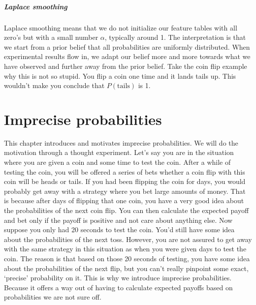 \documentclass{report}
\theoremstyle{definition}
\begin{document}
\paragraph{Laplace smoothing}
Laplace smoothing means that we do not initialize our feature tables with all zero's but with a small number $\alpha$, typically around 1. The interpretation is that we start from a prior belief that all probabilities are uniformly distributed. When experimental results flow in, we adapt our belief more and more towards what we have observed and further away from the prior belief. Take the coin flip example why this is not so stupid. You flip a coin one time and it lands tails up. This wouldn't make you conclude that $P(\text{tails})$ is 1. 






\chapter{Imprecise probabilities}
This chapter introduces and motivates imprecise probabilities. We will do the motivation through a thought experiment. Let's say you are in the situation where you are given a coin and some time to test the coin. After a while of testing the coin, you will be offered a series of bets whether a coin flip with this coin will be heads or tails. If you had been flipping the coin for days, you would probably get away with a strategy where you bet large amounts of money. That is because after days of flipping that one coin, you have a very good idea about the probabilities of the next coin flip. You can then calculate the expected payoff and bet only if the payoff is positive and not care about anything else. Now suppose you only had 20 seconds to test the coin. You'd still have some idea about the probabilities of the next toss. However, you are not assured to get away with the same strategy in this situation as when you were given days to test the coin. The reason is that based on those 20 seconds of testing, you have some idea about the probabilities of the next flip, but you can't really pinpoint some exact, \lq precise' probability on it. This is why we introduce imprecise probabilities. Because it offers a way out of having to calculate expected payoffs based on probabilities we are not sure off.\\
\end{document}
